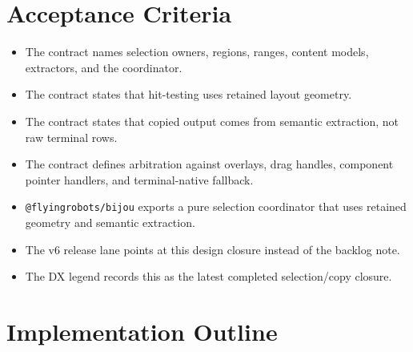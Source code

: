 \section{Acceptance Criteria}\label{record-127-acceptance-criteria}

\begin{itemize}
\tightlist
\item
  The contract names selection owners, regions, ranges, content models, extractors, and the coordinator.
\item
  The contract states that hit-testing uses retained layout geometry.
\item
  The contract states that copied output comes from semantic extraction, not raw terminal rows.
\item
  The contract defines arbitration against overlays, drag handles, component pointer handlers, and terminal-native fallback.
\item
  \texttt{@\allowbreak{}f\allowbreak{}l\allowbreak{}y\allowbreak{}i\allowbreak{}n\allowbreak{}g\allowbreak{}r\allowbreak{}o\allowbreak{}b\allowbreak{}o\allowbreak{}t\allowbreak{}s\allowbreak{}/\allowbreak{}b\allowbreak{}i\allowbreak{}j\allowbreak{}o\allowbreak{}u} exports a pure selection coordinator that uses retained geometry and semantic extraction.
\item
  The v6 release lane points at this design closure instead of the backlog note.
\item
  The DX legend records this as the latest completed selection/copy closure.
\end{itemize}

\section{Implementation Outline}\label{record-127-implementation-outline}

